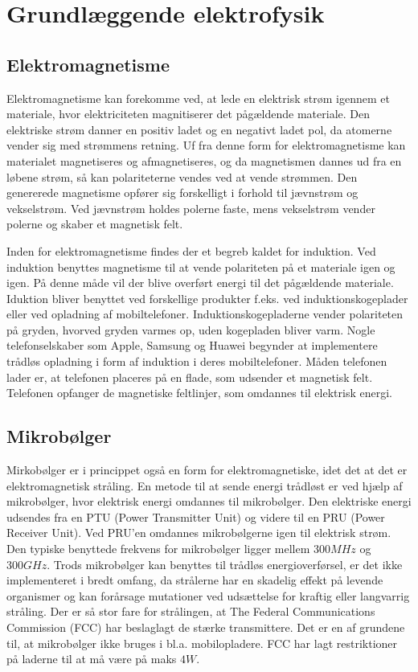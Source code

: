 \section{Grundlæggende elektrofysik}

\subsection{Elektromagnetisme}
Elektromagnetisme kan forekomme ved, at lede en elektrisk strøm igennem et materiale, hvor elektriciteten magnitiserer det pågældende materiale. Den elektriske strøm danner en positiv ladet og en negativt ladet pol, da atomerne vender sig med strømmens retning. Uf fra denne form for elektromagnetisme kan materialet magnetiseres og afmagnetiseres, og da magnetismen dannes ud fra en løbene strøm, så kan polariteterne vendes ved at vende strømmen. Den genererede magnetisme opfører sig forskelligt i forhold til jævnstrøm og vekselstrøm. Ved jævnstrøm holdes polerne faste, mens vekselstrøm vender polerne og skaber et magnetisk felt.

Inden for elektromagnetisme findes der et begreb kaldet for induktion. Ved induktion benyttes magnetisme til at vende polariteten på et materiale igen og igen. På denne måde vil der blive overført energi til det pågældende materiale. Iduktion bliver benyttet ved forskellige produkter f.eks. ved induktionskogeplader eller ved opladning af mobiltelefoner. Induktionskogepladerne vender polariteten på gryden, hvorved gryden varmes op, uden kogepladen bliver varm. Nogle telefonselskaber som Apple, Samsung og Huawei begynder at implementere trådløs opladning i form af induktion i deres mobiltelefoner. Måden telefonen lader er, at telefonen placeres på en flade, som udsender et magnetisk felt. Telefonen opfanger de magnetiske feltlinjer, som omdannes til elektrisk energi. \cite{mikro}

\subsection{Mikrobølger}

Mirkobølger er i princippet også en form for elektromagnetiske, idet det at det er elektromagnetisk stråling. En metode til at sende energi trådløst er ved hjælp af mikrobølger, hvor elektrisk energi omdannes til mikrobølger. Den elektriske energi udsendes fra en PTU (Power Transmitter Unit) og videre til en PRU (Power Receiver Unit). Ved PRU'en omdannes mikrobølgerne igen til elektrisk strøm. Den typiske benyttede frekvens for mikrobølger ligger mellem $300 MHz$ og $300 GHz$. Trods mikrobølger kan benyttes til trådløs energioverførsel, er det ikke implementeret i bredt omfang, da strålerne har en skadelig effekt på levende organismer og kan forårsage mutationer ved udsættelse for kraftig eller langvarrig stråling. Der er så stor fare for strålingen, at The Federal Communications Commission (FCC) har beslaglagt de stærke transmittere. Det er en af grundene til, at mikrobølger ikke bruges i bl.a. mobilopladere. FCC har lagt restriktioner på laderne til at må være på maks $4 W$. \cite{mikro}

\newpage
